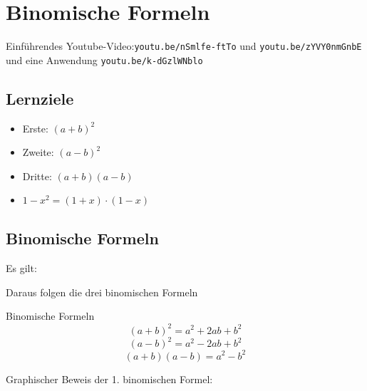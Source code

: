 \newpage
\section{Binomische Formeln}



Einführendes Youtube-Video:\texttt{youtu.be/nSmlfe-ftTo} und \texttt{youtu.be/zYVY0nmGnbE} und eine Anwendung
\texttt{youtu.be/k-dGzlWNblo}

\subsection*{Lernziele}

\begin{itemize}
\item Erste:  $(a+b)^2$ 
\item Zweite: $(a-b)^2$
\item Dritte: $(a+b)(a-b)$
\item $1-x^2 = (1+x)\cdot{}(1-x)$


\end{itemize}
\newpage


\subsection{Binomische Formeln}
Es gilt:


Daraus folgen die drei binomischen Formeln
\begin{gesetz}{Binomische Formeln}{}
$$(a+b)^2 = a^2 + 2ab +b^2$$
\vspace{0.01mm}
$$(a-b)^2 = a^2 - 2ab +b^2$$
\vspace{0.2mm}
$$(a+b)(a-b) = a^2 - b^2$$
\end{gesetz}


Graphischer Beweis der 1. binomischen Formel:

